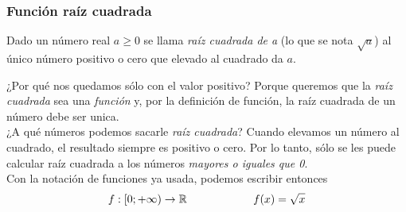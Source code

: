 \documentclass[../Teoría.root.tex]{subfiles}
\begin{document}
\subsubsection{Función raíz cuadrada}
Dado un número real \(a\geq0\) se llama \textit{raíz cuadrada de a} (lo que se nota \(\sqrt{a}\)) al único número positivo o cero que elevado al cuadrado da \(a\).
\begin{center}
\end{center}
¿Por qué nos quedamos sólo con el valor positivo? Porque queremos que la \textit{raíz cuadrada} sea una \textit{función} y, por la definición de función, la raíz cuadrada de un número debe ser unica.\\
¿A qué números podemos sacarle \textit{raíz cuadrada}? Cuando elevamos un número al cuadrado, el resultado siempre es positivo o cero.
Por lo tanto, sólo se les puede calcular raíz cuadrada a los números \textit{mayores o iguales que 0}.\\
Con la notación de funciones ya usada, podemos escribir entonces
\[f:[0;+\infty)\rightarrow\mathbb{R} \qquad\qquad\qquad f(x)=\sqrt{x}\]
\end{document}
